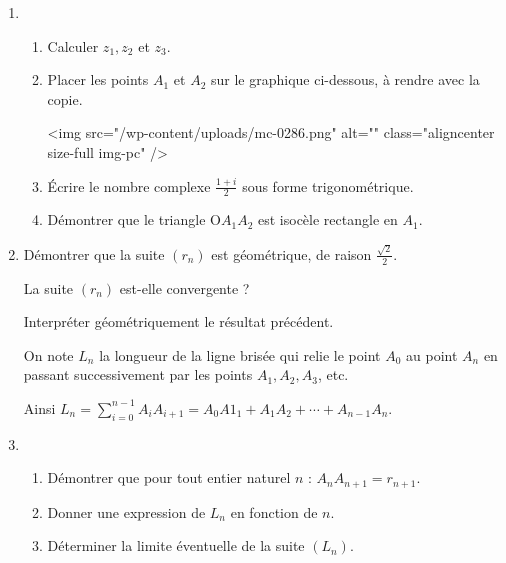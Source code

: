      \begin{enumerate}
          \item
          \begin{enumerate}[label=\alph*.]
               \item
               Calculer $z_{1}, z_{2}$ et $z_{3}$.
               \item
               Placer les points $A_{1}$ et $A_{2}$ sur le graphique ci-dessous, à rendre avec la copie.

\begin{center}
\end{center}
               <img src="/wp-content/uploads/mc-0286.png" alt="" class="aligncenter size-full  img-pc" />
               \item
               Écrire le nombre complexe $\frac{1+i}{2}$ sous forme trigonométrique.
               \item
          Démontrer que le triangle O$A_{1}A_{2}$ est isocèle rectangle en $A_{1}$.
\end{enumerate}
          \item
          Démontrer que la suite $\left(r_{n}\right)$ est géométrique, de raison $\frac{\sqrt{2}}{2}$.
          \par
          La suite $\left(r_{n}\right)$ est-elle convergente ?
          \par
          Interpréter géométriquement le résultat précédent.
          \par
          On note $L_{n}$ la longueur de la ligne brisée qui relie le point $A_{0}$ au point $A_{n}$ en passant successivement par les points $A_{1}, A_{2},  A_{3}$,  etc.
          \par
          Ainsi $ L_{n}=\sum_{i=0}^{n-1} A_{i}A_{i+1}= A_{0}A1_{1}+A_{1}A_{2}+\cdots +A_{n-1}A_{n}.$
          \item
          \begin{enumerate}[label=\alph*.]
               \item
               Démontrer que pour tout entier naturel $n$ : $A_{n}A_{n+1}=r_{n+1}$.
               \item
               Donner une expression de $L_{n}$ en fonction de $n$.
               \item
          Déterminer la limite éventuelle de la suite $\left(L_{n}\right)$.\end{enumerate}
     \end{enumerate}
